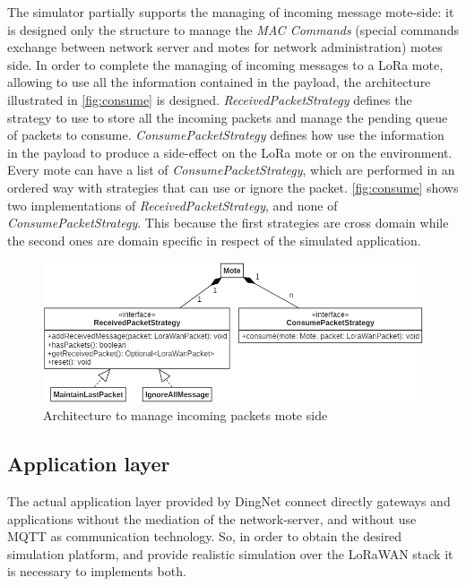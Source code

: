 The simulator partially supports the managing of incoming message mote-side: it is designed only the structure to manage the \textit{MAC Commands} (special commands exchange between network server and motes for network administration) motes side.
In order to complete the managing of incoming messages to a LoRa mote, allowing to use all the information contained in the payload, the architecture illustrated in \autoref{fig:consume} is designed.
\mbox{\textit{ReceivedPacketStrategy}} defines the strategy to use to store all the incoming packets and manage the pending queue of packets to consume.
\mbox{\textit{ConsumePacketStrategy}} defines how use the information in the payload to produce a side-effect on the LoRa mote or on the environment. 
Every mote can have a list of \mbox{\textit{ConsumePacketStrategy}}, which are performed in an ordered way with strategies that can use or ignore the packet.
\autoref{fig:consume} shows two implementations of \mbox{\textit{ReceivedPacketStrategy}}, and none of \mbox{\textit{ConsumePacketStrategy}}. This because the first strategies are cross domain while the second ones are domain specific in respect of the simulated application.
% 
\begin{figure}[h]
    \centering
    \includegraphics[width=\textwidth]{figures/consumePacket.png}
    \caption{Architecture to manage incoming packets mote side}
    \label{fig:consume}
\end{figure}
% 

\subsection*{Application layer}
The actual application layer provided by DingNet connect directly gateways and applications without the mediation of the network-server, and without use MQTT as communication technology.
So, in order to obtain the desired simulation platform, and provide realistic simulation over the LoRaWAN stack it is necessary to implements both.

